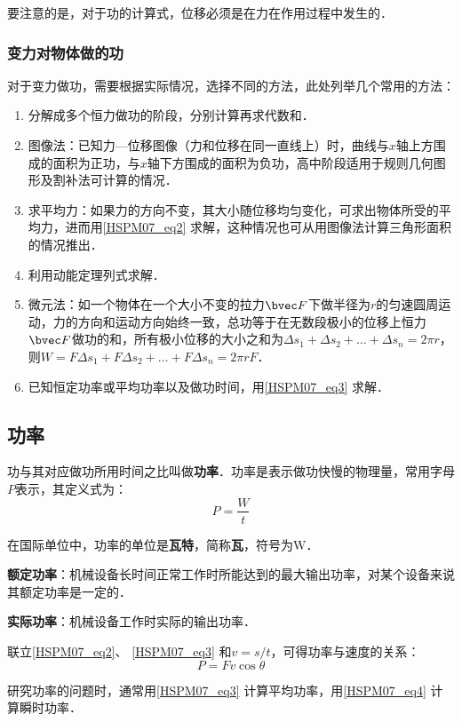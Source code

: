 要注意的是，对于功的计算式，位移必须是在力在作用过程中发生的．

\subsubsection{变力对物体做的功}

对于变力做功，需要根据实际情况，选择不同的方法，此处列举几个常用的方法：


\begin{enumerate}
\item 分解成多个恒力做功的阶段，分别计算再求代数和．

\item 图像法：已知力—位移图像（力和位移在同一直线上）时，曲线与$x$轴上方围成的面积为正功，与$x$轴下方围成的面积为负功，高中阶段适用于规则几何图形及割补法可计算的情况．

\item 求平均力：如果力的方向不变，其大小随位移均匀变化，可求出物体所受的平均力，进而用\autoref{HSPM07_eq2} 求解，这种情况也可从用图像法计算三角形面积的情况推出．

\item 利用动能定理列式求解．

\item 微元法：如一个物体在一个大小不变的拉力$\bvec F$下做半径为$r$的匀速圆周运动，力的方向和运动方向始终一致，总功等于在无数段极小的位移上恒力$\bvec F$做功的和，所有极小位移的大小之和为$\Delta s_1+\Delta s_2+\dots+\Delta s_n=2\pi r$，则$W=F\Delta s_1+F\Delta s_2+\dots+F\Delta s_n=2\pi rF$．

\item 已知恒定功率或平均功率以及做功时间，用\autoref{HSPM07_eq3} 求解．
\end{enumerate}

\subsection{功率}

功与其对应做功所用时间之比叫做\textbf{功率}．功率是表示做功快慢的物理量，常用字母$P$表示，其定义式为：
\begin{equation}\label{HSPM07_eq3}
P=\frac{W}{t}
\end{equation}

在国际单位中，功率的单位是\textbf{瓦特}，简称\textbf{瓦}，符号为$\mathrm{W}$．

\textbf{额定功率}：机械设备长时间正常工作时所能达到的最大输出功率，对某个设备来说其额定功率是一定的．

\textbf{实际功率}：机械设备工作时实际的输出功率．

联立\autoref{HSPM07_eq2}、 \autoref{HSPM07_eq3} 和$v=s/t$，可得功率与速度的关系：
\begin{equation}\label{HSPM07_eq4}
P=Fv\cos \theta
\end{equation}

研究功率的问题时，通常用\autoref{HSPM07_eq3} 计算平均功率，用\autoref{HSPM07_eq4} 计算瞬时功率．
